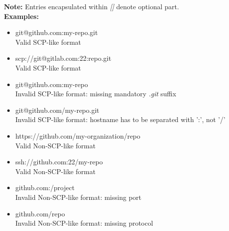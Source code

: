 \documentclass[../main.tex]{subfiles}
\begin{document}
\textbf{Note:} Entries encapsulated within \textit{[]} denote optional part.\\

\textbf{Examples:}
\begin{itemize}
    \item git@github.com:my-repo.git\\
    Valid SCP-like format

    \item scp://git@gitlab.com:22:repo.git\\
    Valid SCP-like format

    \item git@github.com:my-repo\\
    Invalid SCP-like format: missing mandatory \textit{.git} suffix

    \item git@github.com/my-repo.git\\
    Invalid SCP-like format: hostname has to be separated with ':', not '/'

    \item https://github.com/my-organization/repo\\
    Valid Non-SCP-like format
    
    \item ssh://github.com:22/my-repo\\
    Valid Non-SCP-like format

    \item github.com:/project\\
    Invalid Non-SCP-like format: missing port

    \item github.com/repo\\
    Invalid Non-SCP-like format: missing protocol
\end{itemize}
\end{document}
